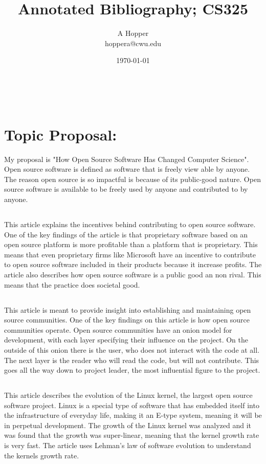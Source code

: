 \documentclass[12pt,letterpaper]{article}
\title{Annotated Bibliography; CS325}
\author{A Hopper \\ hoppera@cwu.edu}
\date{\today}
\makeatletter
\renewcommand{\maketitle}{\bgroup
   \begin{center}
   \textbf{{\fontsize{18pt}{20}\selectfont \@title}}\\
   \vspace{10pt}
   {\fontsize{12pt}{0}\selectfont \@author} 
   \end{center}
}
\makeatother
\begin{document}
\maketitle
\thispagestyle{fancy}

\section*{Topic Proposal: }
My proposal is "How Open Source Software Has Changed Computer Science". Open source software is defined as software that is freely view able by anyone. The reason open source is so impactful is because of its public-good nature. Open source software is available to be freely used by anyone and contributed to by anyone. 


\subsection*{}
This article explains the incentives behind contributing to open source software. One of the key findings of the article is that proprietary software based on an open source platform is more profitable than a platform that is proprietary. This means that even proprietary firms like Microsoft have an incentive to contribute to open source software included in their products because it increase profits. The article also describes how open source software is a public good an non rival. This means that the practice does societal good.

\subsection*{}
This article is meant to provide insight into establishing and maintaining open source communities. One of the key findings on this article is how open source communities operate. Open source communities have an onion model for development, with each layer specifying their influence on the project. On the outside of this onion there is the user, who does not interact with the code at all. The next layer is the reader who will read the code, but will not contribute. This goes all the way down to project leader, the most influential figure to the project.

\subsection*{}
This article describes the evolution of the Linux kernel, the largest open source software project. Linux is a special type of software that has embedded itself into the infrastructure of everyday life, making it an E-type system, meaning it will be in perpetual development. The growth of the Linux kernel was analyzed and it was found that the growth was super-linear, meaning that the kernel growth rate is very fast. The article uses Lehman's law of software evolution to understand the kernels growth rate.
\end{document}
